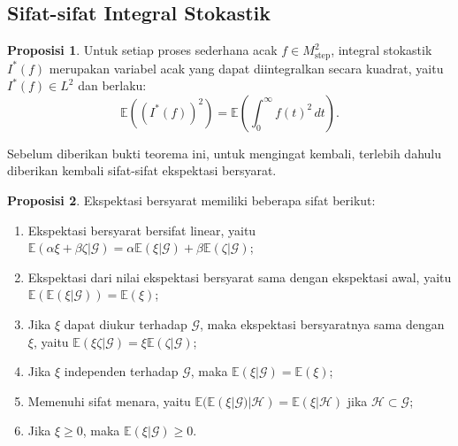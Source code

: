 \documentclass[aspectratio=169,11pt]{beamer}
\theoremstyle{definition}
\newtheorem{proposisi}{Proposisi}
\begin{document}
\subsection{Sifat-sifat Integral Stokastik}
\begin{frame}{\insertsection}{\insertsubsection}
  \begin{proposisi}\label{prop:5.1}
    Untuk setiap proses sederhana acak $f \in M_{\text{step}}^2$, integral stokastik $I^*(f)$ merupakan variabel acak yang dapat diintegralkan secara kuadrat, yaitu $I^*(f) \in L^2$ dan berlaku:
    \begin{equation*}
      \mathbb{E}((I^*(f))^2) = \mathbb{E}\left(\int_0^\infty f(t)^2 \, dt\right).
    \end{equation*}
  \end{proposisi}
  Sebelum diberikan bukti teorema ini, untuk mengingat kembali, terlebih dahulu diberikan kembali sifat-sifat ekspektasi bersyarat.
\end{frame}

\begin{frame}[allowframebreaks]{\insertsection}{\insertsubsection}
  \begin{proposisi}
    Ekspektasi bersyarat memiliki beberapa sifat berikut:
    \begin{enumerate}
      \item Ekspektasi bersyarat bersifat linear, yaitu $\mathbb{E}(\alpha \xi + \beta \zeta | \mathcal{G}) = \alpha \mathbb{E}(\xi | \mathcal{G}) + \beta \mathbb{E}(\zeta | \mathcal{G})$;
      \item Ekspektasi dari nilai ekspektasi bersyarat sama dengan ekspektasi awal, yaitu $\mathbb{E}(\mathbb{E}(\xi | \mathcal{G})) = \mathbb{E}(\xi)$;
      \item Jika $\xi$ dapat diukur terhadap $\mathcal{G}$, maka ekspektasi bersyaratnya sama dengan $\xi$, yaitu $\mathbb{E}(\xi \zeta | \mathcal{G}) = \xi \mathbb{E}(\zeta | \mathcal{G})$;
      \item Jika $\xi$ independen terhadap $\mathcal{G}$, maka $\mathbb{E}(\xi | \mathcal{G}) = \mathbb{E}(\xi)$;
      \item Memenuhi sifat menara, yaitu $\mathbb{E}(\mathbb{E}(\xi | \mathcal{G}) | \mathcal{H}) = \mathbb{E}(\xi | \mathcal{H})$ jika $\mathcal{H} \subset \mathcal{G}$;
      \item Jika $\xi \geq 0$, maka $\mathbb{E}(\xi | \mathcal{G}) \geq 0$.
    \end{enumerate}
  \end{proposisi}
\end{frame}
\end{document}

